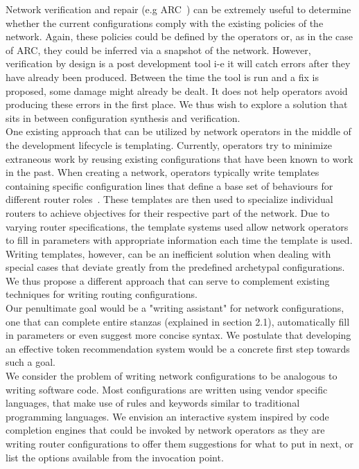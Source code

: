 Network verification and repair (e.g ARC~\cite{arc}) can be extremely useful to determine whether the current configurations comply with the existing policies of the network. Again, these policies could be defined by the operators or, as in the case of ARC, they could be inferred via a snapshot of the network. However, verification by design is a post development tool i-e it will catch errors after they have already been produced. Between the time the tool is run and a fix is proposed, some damage might already be dealt. It does not help operators avoid producing these errors in the first place. We thus wish to explore a solution that sits in between configuration synthesis and verification.\\

One existing approach that can be utilized by network operators in the middle of the development lifecycle is templating. Currently, operators try to minimize extraneous work by reusing existing configurations that have been known to work in the past. When creating a network, operators typically write templates containing specific configuration lines that define a base set of behaviours for different router roles~\cite{complexity}. These templates are then used to specialize individual routers to achieve objectives for their respective part of the network. Due to varying router specifications, the template systems used allow network operators to fill in parameters with appropriate information each time the template is used. Writing templates, however, can be an inefficient solution when dealing with special cases that deviate greatly from the predefined archetypal configurations. We thus propose a different approach that can serve to complement existing techniques for writing routing configurations.\\ 

Our penultimate goal would be a "writing assistant" for network configurations, one that can complete entire stanzas (explained in section 2.1), automatically fill in parameters or even suggest more concise syntax. We postulate that developing an effective token recommendation system would be a concrete first step towards such a goal.\\

We consider the problem of writing network configurations to be analogous to writing software code. Most configurations are written using vendor specific languages, that make use of rules and keywords similar to traditional programming languages. We envision an interactive system inspired by code completion engines that could be invoked by network operators as they are writing router configurations to offer them suggestions for what to put in next, or list the options available from the invocation point.\\ 

